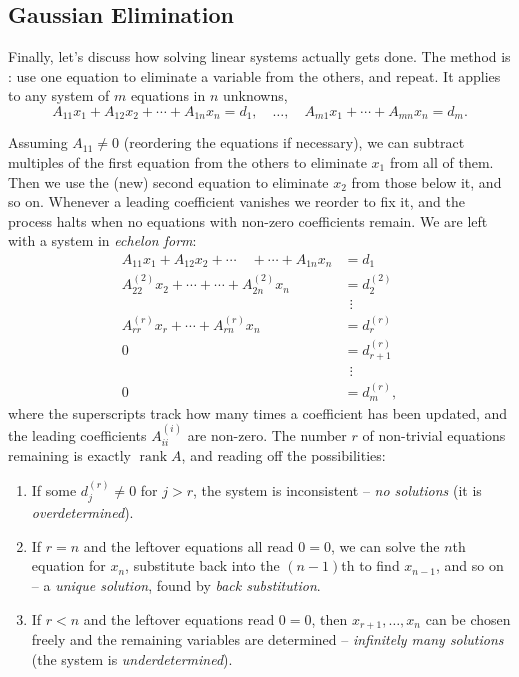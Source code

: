 \documentclass[a4paper]{scrartcl}
\newcommand{\rank}{\operatorname{rank}}
\begin{document}
\subsection{Gaussian Elimination}

Finally, let's discuss how solving linear systems actually gets done. The method is : use one equation to eliminate a variable from the others, and repeat. It applies to any system of $m$ equations in $n$ unknowns,
$$
A_{11}x_1 + A_{12}x_2 + \cdots + A_{1n}x_n = d_1, \quad \dots, \quad A_{m1}x_1 + \cdots + A_{mn}x_n = d_m.
$$

Assuming $A_{11} \neq 0$ (reordering the equations if necessary), we can subtract multiples of the first equation from the others to eliminate $x_1$ from all of them. Then we use the (new) second equation to eliminate $x_2$ from those below it, and so on. Whenever a leading coefficient vanishes we reorder to fix it, and the process halts when no equations with non-zero coefficients remain. We are left with a system in \emph{echelon form}:
\begin{align*}
	A_{11}x_1 + A_{12}x_2 + \cdots \quad + \cdots + A_{1n}x_n &= d_1 \\
	A^{(2)}_{22}x_2 + \cdots + \cdots + A^{(2)}_{2n}x_n &= d^{(2)}_2 \\
	&\ \ \vdots\\
	A^{(r)}_{rr}x_r + \cdots + A^{(r)}_{rn}x_n &= d^{(r)}_r \\
	0 &= d^{(r)}_{r + 1} \\
	&\ \ \vdots \\
	0 &= d^{(r)}_m,
\end{align*}
where the superscripts track how many times a coefficient has been updated, and the leading coefficients $A^{(i)}_{ii}$ are non-zero. The number $r$ of non-trivial equations remaining is exactly $\rank A$, and reading off the possibilities:
\begin{enumerate}[label=(\roman*)]
	\item If some $d^{(r)}_{j} \neq 0$ for $j > r$, the system is inconsistent -- \emph{no solutions} (it is \emph{overdetermined}).
	\item If $r = n$ and the leftover equations all read $0 = 0$, we can solve the $n$th equation for $x_n$, substitute back into the $(n-1)$th to find $x_{n - 1}$, and so on -- a \emph{unique solution}, found by \emph{back substitution}.
	\item If $r < n$ and the leftover equations read $0 = 0$, then $x_{r + 1}, \dots, x_n$ can be chosen freely and the remaining variables are determined -- \emph{infinitely many solutions} (the system is \emph{underdetermined}).
\end{enumerate}
\end{document}
